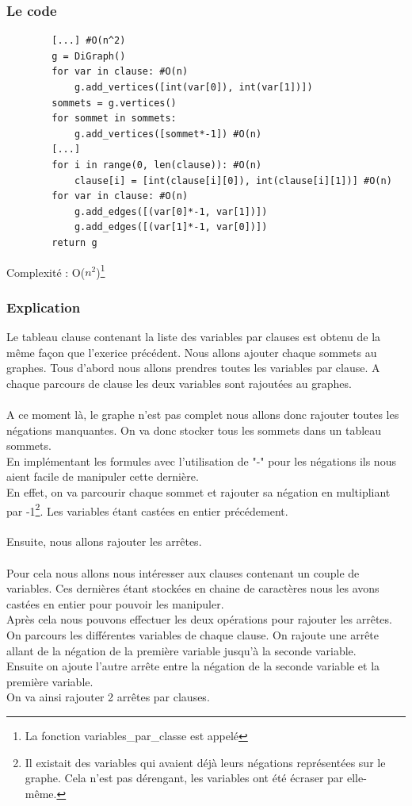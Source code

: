 \documentclass{article}
\begin{document}
    \subsubsection*{Le code}
    \begin{lstlisting}
        [...] #O(n^2)
        g = DiGraph()
        for var in clause: #O(n)
            g.add_vertices([int(var[0]), int(var[1])])
        sommets = g.vertices()
        for sommet in sommets:
            g.add_vertices([sommet*-1]) #O(n)
        [...]
        for i in range(0, len(clause)): #O(n)
            clause[i] = [int(clause[i][0]), int(clause[i][1])] #O(n)
        for var in clause: #O(n)
            g.add_edges([(var[0]*-1, var[1])])
            g.add_edges([(var[1]*-1, var[0])])
        return g
    \end{lstlisting} 
    Complexité : O($n^2$)\footnote{La fonction variables\_par\_classe est appelé}
    \subsubsection*{Explication}
    Le tableau clause contenant la liste des variables par clauses est obtenu de la même façon que l'exerice précédent.
    Nous allons ajouter chaque sommets au graphes. Tous d'abord nous allons prendres toutes les variables par clause. A chaque parcours de clause les deux variables sont rajoutées au graphes. \\
    \\ A ce moment là, le graphe n'est pas complet nous allons donc rajouter toutes les négations manquantes. On va donc stocker tous les sommets dans un tableau sommets. \\
    En implémentant les formules avec l'utilisation de "-" pour les négations ils nous aient facile de manipuler cette dernière. \\
    En effet, on va parcourir chaque sommet et rajouter sa négation en multipliant par -1\footnote{Il existait des variables qui avaient déjà leurs négations représentées sur le graphe. Cela n'est pas dérengant, les variables ont été écraser par elle-même.}. Les variables étant castées en entier précédement. \\
    \\
    Ensuite, nous allons rajouter les arrêtes. \\
    \\ Pour cela nous allons nous intéresser aux clauses contenant un couple de variables. Ces dernières étant stockées en chaine de caractères nous les avons castées en entier pour pouvoir les manipuler. \\
    Après cela nous pouvons effectuer les deux opérations pour rajouter les arrêtes. \\
    On parcours les différentes variables de chaque clause. On rajoute une arrête allant de la négation de la première variable jusqu'à la seconde variable. \\
    Ensuite on ajoute l'autre arrête entre la négation de la seconde variable et la première variable. \\
    On va ainsi rajouter 2 arrêtes par clauses.
\end{document}
